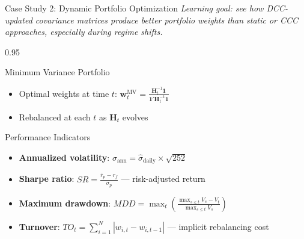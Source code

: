 \documentclass[9pt, aspectratio=169, t]{beamer}
\begin{document}
\begin{frame}{Case Study 2: Dynamic Portfolio Optimization}
    \vspace{-2mm}
    {\scriptsize\textit{Learning goal: see how DCC-updated covariance matrices produce better portfolio weights than static or CCC approaches, especially during regime shifts.}}\vspace{1mm}
    \begin{cminipage}{0.95\textwidth}
    {\footnotesize
    \begin{block}{Minimum Variance Portfolio}
        \begin{itemize}\setlength{\itemsep}{0pt}
            \item Optimal weights at time $t$: $\mathbf{w}_t^{\text{MV}} = \frac{\mathbf{H}_t^{-1}\mathbf{1}}{\mathbf{1}'\mathbf{H}_t^{-1}\mathbf{1}}$
            \item Rebalanced at each $t$ as $\mathbf{H}_t$ evolves
        \end{itemize}
    \end{block}
    \begin{block}{Performance Indicators}
        \begin{itemize}\setlength{\itemsep}{0pt}
            \item \textbf{Annualized volatility}: $\sigma_{\text{ann}} = \hat\sigma_{\text{daily}} \times \sqrt{252}$
            \item \textbf{Sharpe ratio}: $SR = \frac{\bar{r}_p - r_f}{\sigma_p}$ --- risk-adjusted return
            \item \textbf{Maximum drawdown}: $MDD = \max_{t}\left(\frac{\max_{s \leq t} V_s - V_t}{\max_{s \leq t} V_s}\right)$
            \item \textbf{Turnover}: $TO_t = \sum_{i=1}^{N}|w_{i,t} - w_{i,t-1}|$ --- implicit rebalancing cost
        \end{itemize}
    \end{block}
    }
    \end{cminipage}
\end{frame}
\end{document}
